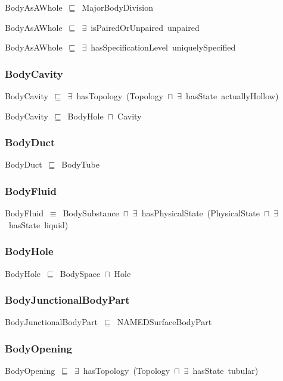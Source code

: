 \documentclass{article}
\begin{document}
BodyAsAWhole~\ensuremath{\sqsubseteq}~MajorBodyDivision~

BodyAsAWhole~\ensuremath{\sqsubseteq}~\ensuremath{\exists}~isPairedOrUnpaired~unpaired~

BodyAsAWhole~\ensuremath{\sqsubseteq}~\ensuremath{\exists}~hasSpecificationLevel~uniquelySpecified~

\subsubsection*{BodyCavity}

BodyCavity~\ensuremath{\sqsubseteq}~\ensuremath{\exists}~hasTopology~(Topology~\ensuremath{\sqcap}~\ensuremath{\exists}~hasState~actuallyHollow)~

BodyCavity~\ensuremath{\sqsubseteq}~BodyHole~\ensuremath{\sqcap}~Cavity~

\subsubsection*{BodyDuct}

BodyDuct~\ensuremath{\sqsubseteq}~BodyTube~

\subsubsection*{BodyFluid}

BodyFluid~\ensuremath{\equiv}~BodySubstance~\ensuremath{\sqcap}~\ensuremath{\exists}~hasPhysicalState~(PhysicalState~\ensuremath{\sqcap}~\ensuremath{\exists}~hasState~liquid)

\subsubsection*{BodyHole}

BodyHole~\ensuremath{\sqsubseteq}~BodySpace~\ensuremath{\sqcap}~Hole~

\subsubsection*{BodyJunctionalBodyPart}

BodyJunctionalBodyPart~\ensuremath{\sqsubseteq}~NAMEDSurfaceBodyPart~

\subsubsection*{BodyOpening}

BodyOpening~\ensuremath{\sqsubseteq}~\ensuremath{\exists}~hasTopology~(Topology~\ensuremath{\sqcap}~\ensuremath{\exists}~hasState~tubular)~
\end{document}
